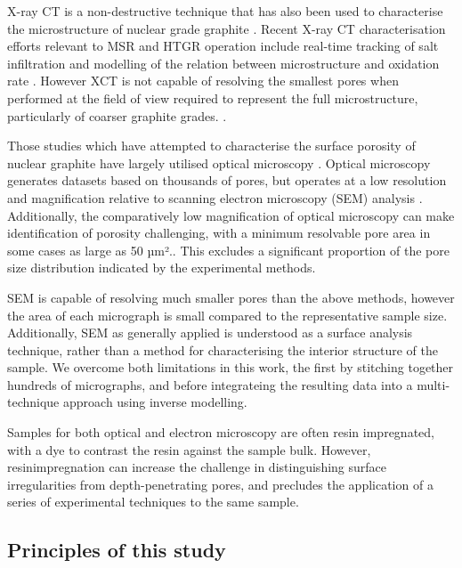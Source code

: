 \documentclass[review]{elsarticle}
\begin{document}
X-ray CT is a non-destructive technique that has also been used to characterise
the microstructure of nuclear grade graphite
\citep{ARREGUIMENA2022112047,KANE2020291,Liu2017, MOSTAFAVI2013410,
BARHLI2017357}. Recent X-ray CT characterisation efforts relevant to MSR and
HTGR operation include real-time tracking of salt infiltration and modelling of
the relation between microstructure and oxidation rate \citep{ZHANG2024102016,
PAUL2022132}. However XCT is not capable of resolving the smallest pores 
when performed at the field of view required to represent the full microstructure, particularly of coarser graphite grades. \citep{ARREGUIMENA2022112047}. 

Those studies which have attempted to characterise the surface porosity of
nuclear graphite have largely utilised optical microscopy \citep{Huang2019, Kane2011a,
Taylor2016}.  Optical microscopy generates datasets based on thousands of pores,
but operates at a low resolution and magnification relative to scanning electron
microscopy (SEM) analysis \citep{Huang2014,
huang2021statistical,ARREGUIMENA2022112047}.
 Additionally, the comparatively low magnification
of optical microscopy can make identification of porosity challenging, with a minimum resolvable
pore area in some cases as large as 50 µm².\citep{Taylor2016}.  This excludes a significant
proportion of the pore size distribution indicated by the experimental methods.

SEM is capable of resolving much smaller pores than the above methods, however 
the area of each micrograph is small compared to the
representative sample size. Additionally, SEM as generally applied is understood
as a surface analysis technique, rather than a method for characterising the
interior structure of the sample. We overcome both limitations in this work, the first by stitching
together hundreds of micrographs, and before integrateing the resulting data into a multi-technique approach using inverse modelling.

Samples for both optical and electron microscopy are often resin impregnated,
with a dye to contrast the resin against the sample bulk.  However, resinimpregnation can increase the challenge in distinguishing surface irregularities from depth-penetrating pores, and precludes the application of a series of
experimental techniques to the same sample.

\subsection{Principles of this study}
\end{document}
